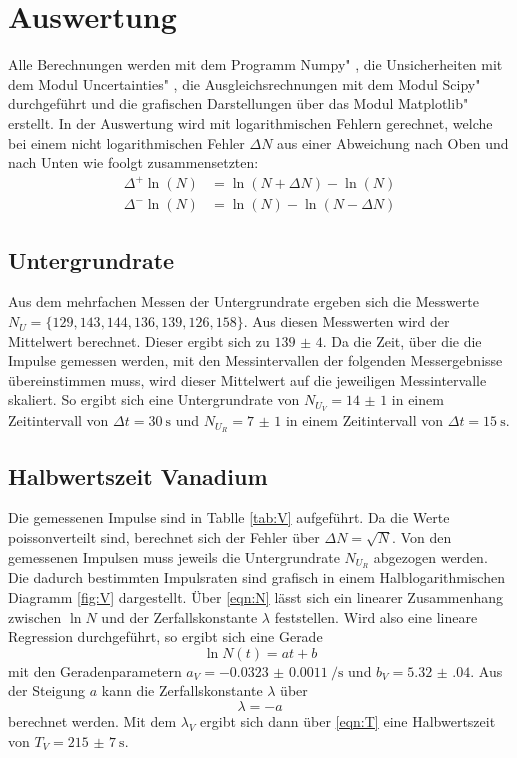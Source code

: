 \section{Auswertung}
\label{sec:Auswertung}

Alle Berechnungen werden mit dem Programm \glqq Numpy" \cite{numpy}, die Unsicherheiten mit dem Modul \glqq Uncertainties" \cite{uncertainties}, die Ausgleichsrechnungen mit dem Modul \glqq Scipy" \cite{scipy} durchgeführt und die grafischen Darstellungen über das Modul \glqq Matplotlib" \cite{matplotlib} erstellt.
In der Auswertung wird mit logarithmischen Fehlern gerechnet, welche bei einem nicht logarithmischen Fehler $\Delta N$ aus einer Abweichung nach Oben und nach Unten wie foolgt zusammensetzten:
\begin{align*}
    \Delta^{+} \ln (N)&=\ln (N+\Delta N)-\ln (N) \\
    \Delta^{-} \ln (N)&=\ln (N)-\ln (N-\Delta N)
\end{align*}

\subsection{Untergrundrate}

Aus dem mehrfachen Messen der Untergrundrate ergeben sich die Messwerte $N_U=\{ 129, 143, 144, 136, 139, 126, 158 \}$. Aus diesen Messwerten wird der Mittelwert berechnet. Dieser ergibt sich zu $\num{139(4)}$. Da die Zeit, über die die Impulse gemessen werden, mit den Messintervallen der folgenden Messergebnisse übereinstimmen muss, wird  dieser Mittelwert auf die jeweiligen Messintervalle skaliert. So ergibt sich eine Untergrundrate von $N_{U_V}=\num{14(1)}$ in einem Zeitintervall von $\Delta t=\SI{30}{\s}$ und $N_{U_R}=\num{7(1)}$ in einem Zeitintervall von $\Delta t=\SI{15}{\s}$.

\subsection{Halbwertszeit Vanadium}
\label{Vanadium}

Die gemessenen Impulse sind in Tablle \ref{tab:V} aufgeführt. Da die Werte poissonverteilt sind, berechnet sich der Fehler über $\Delta N=\sqrt{N}$. Von den gemessenen Impulsen muss jeweils die Untergrundrate $N_{U_R}$ abgezogen werden. Die dadurch bestimmten Impulsraten sind grafisch in einem Halblogarithmischen Diagramm \ref{fig:V} dargestellt. Über \eqref{eqn:N} lässt sich ein linearer Zusammenhang zwischen $\ln{N}$ und der Zerfallskonstante $\lambda $ feststellen. Wird also eine lineare Regression durchgeführt, so ergibt sich eine Gerade
\begin{equation}
    \ln{N}(t)=at + b
    \label{eqn:gerade}
\end{equation}
mit den Geradenparametern $a_V=\SI[per-mode=reciprocal]{-0.0323(00011)}{\per\s}$ und $b_V=\num{5.32(04)}$. 
Aus der Steigung $a$ kann die Zerfallskonstante $\lambda$ über
\begin{equation}
    \lambda=-a
\label{eqn:lamb}
\end{equation}
berechnet werden. Mit dem $\lambda_V$ ergibt sich dann über \eqref{eqn:T} eine Halbwertszeit von 
${T_V=\SI{215(7)}{\s}}$.


